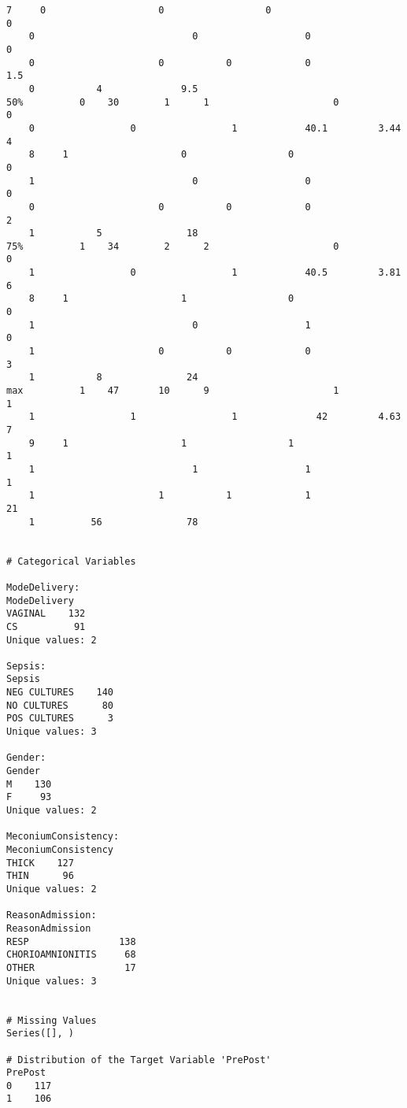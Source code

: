\documentclass[11pt]{article}
\begin{document}
\begin{Verbatim}[tabsize=4]
	7     0                    0                  0                             0
	0                            0                   0                           0
	0                      0           0             0                  1.5
	0           4              9.5
50%          0    30        1      1                      0                 0
	0                 0                 1            40.1         3.44       4
	8     1                    0                  0                             0
	1                            0                   0                           0
	0                      0           0             0                    2
	1           5               18
75%          1    34        2      2                      0                 0
	1                 0                 1            40.5         3.81       6
	8     1                    1                  0                             0
	1                            0                   1                           0
	1                      0           0             0                    3
	1           8               24
max          1    47       10      9                      1                 1
	1                 1                 1              42         4.63       7
	9     1                    1                  1                             1
	1                            1                   1                           1
	1                      1           1             1                   21
	1          56               78


# Categorical Variables

ModeDelivery:
ModeDelivery
VAGINAL    132
CS          91
Unique values: 2

Sepsis:
Sepsis
NEG CULTURES    140
NO CULTURES      80
POS CULTURES      3
Unique values: 3

Gender:
Gender
M    130
F     93
Unique values: 2

MeconiumConsistency:
MeconiumConsistency
THICK    127
THIN      96
Unique values: 2

ReasonAdmission:
ReasonAdmission
RESP                138
CHORIOAMNIONITIS     68
OTHER                17
Unique values: 3


# Missing Values
Series([], )

# Distribution of the Target Variable 'PrePost'
PrePost
0    117
1    106


\end{Verbatim}
\end{document}
